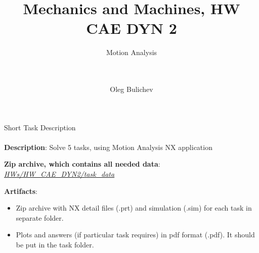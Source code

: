 \documentclass[aspectratio=169]{beamer}
\title[MaM]{Mechanics and Machines, HW CAE DYN 2} %
\subtitle{Motion Analysis
\\ \  \\ \ 
         } %
\author{Oleg Bulichev}
\newcommand{\fbckg}[1]{\usebackgroundtemplate{\texttt{[image: \#1]}}}%
\begin{document}
\setlength{\abovedisplayskip}{0pt}
\setlength{\belowdisplayskip}{0pt}
\setlength{\abovedisplayshortskip}{0pt}
\setlength{\belowdisplayshortskip}{0pt}

\fbckg{fibeamer/figs/title_page.png}

\fbckg{fibeamer/figs/common.png}

\note{\scriptsize \begin{itemize}
        \item \
    \end{itemize}}

\note{
    \
}

\begin{frame}[t]{Short Task Description}
    \framesubtitle{}
    \textbf{Description}: Solve 5 tasks, using Motion Analysis NX application

    \textbf{Zip archive, which contains all needed data}: \href{https://github.com/Lupasic/MaM_Inno_2023/tree/main/HWs/HW_CAE_DYN2/task_data}{\textit{HWs/HW\_CAE\_DYN2/task\_data}} 

    \textbf{Artifacts}:
    \begin{itemize}
        \item Zip archive with NX detail files (.prt) and simulation (.sim) for each task in separate folder.
        \item Plots and answers (if particular task requires) in pdf format (.pdf). It should be put in the task folder.
    \end{itemize}
\end{frame}
\end{document}
